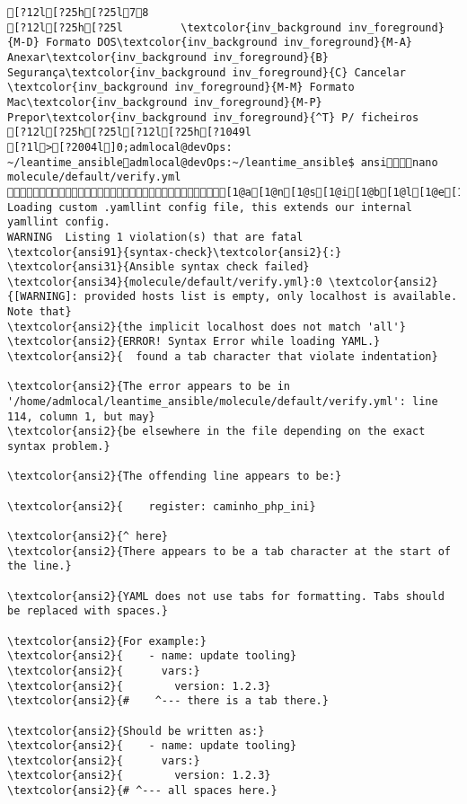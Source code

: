 \documentclass{scrartcl}
\begin{document}
\begin{Verbatim}
[?12l[?25h[?25l78
[?12l[?25h[?25l         \textcolor{inv_background inv_foreground}{M-D} Formato DOS\textcolor{inv_background inv_foreground}{M-A} Anexar\textcolor{inv_background inv_foreground}{B} Segurança\textcolor{inv_background inv_foreground}{C} Cancelar           \textcolor{inv_background inv_foreground}{M-M} Formato Mac\textcolor{inv_background inv_foreground}{M-P} Prepor\textcolor{inv_background inv_foreground}{^T} P/ ficheiros
[?12l[?25h[?25l[?12l[?25h[?1049l
[?1l>[?2004l]0;admlocal@devOps: ~/leantime_ansibleadmlocal@devOps:~/leantime_ansible$ ansinano molecule/default/verify.yml [1@a[1@n[1@s[1@i[1@b[1@l[1@e[1@/[1@l[1@i[1@n[1@t[1@-
Loading custom .yamllint config file, this extends our internal yamllint config.
WARNING  Listing 1 violation(s) that are fatal
\textcolor{ansi91}{syntax-check}\textcolor{ansi2}{:} \textcolor{ansi31}{Ansible syntax check failed}
\textcolor{ansi34}{molecule/default/verify.yml}:0 \textcolor{ansi2}{[WARNING]: provided hosts list is empty, only localhost is available. Note that}
\textcolor{ansi2}{the implicit localhost does not match 'all'}
\textcolor{ansi2}{ERROR! Syntax Error while loading YAML.}
\textcolor{ansi2}{  found a tab character that violate indentation}

\textcolor{ansi2}{The error appears to be in '/home/admlocal/leantime_ansible/molecule/default/verify.yml': line 114, column 1, but may}
\textcolor{ansi2}{be elsewhere in the file depending on the exact syntax problem.}

\textcolor{ansi2}{The offending line appears to be:}

\textcolor{ansi2}{    register: caminho_php_ini}

\textcolor{ansi2}{^ here}
\textcolor{ansi2}{There appears to be a tab character at the start of the line.}

\textcolor{ansi2}{YAML does not use tabs for formatting. Tabs should be replaced with spaces.}

\textcolor{ansi2}{For example:}
\textcolor{ansi2}{    - name: update tooling}
\textcolor{ansi2}{      vars:}
\textcolor{ansi2}{        version: 1.2.3}
\textcolor{ansi2}{#    ^--- there is a tab there.}

\textcolor{ansi2}{Should be written as:}
\textcolor{ansi2}{    - name: update tooling}
\textcolor{ansi2}{      vars:}
\textcolor{ansi2}{        version: 1.2.3}
\textcolor{ansi2}{# ^--- all spaces here.}



\end{Verbatim}
\end{document}
